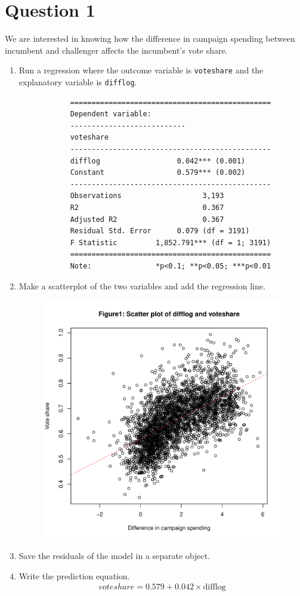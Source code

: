 \documentclass[12pt,letterpaper]{article}
\begin{document}
\section*{Question 1}
\vspace{.25cm}
\noindent We are interested in knowing how the difference in campaign spending between incumbent and challenger affects the incumbent's vote share. 
	\begin{enumerate}
		\item Run a regression where the outcome variable is \texttt{voteshare} and the explanatory variable is \texttt{difflog}.
		
		\begin{verbatim}
			===============================================
			Dependent variable:    
			---------------------------
			voteshare         
			-----------------------------------------------
			difflog                  0.042*** (0.001)      
			Constant                 0.579*** (0.002)      
			-----------------------------------------------
			Observations                   3,193           
			R2                             0.367           
			Adjusted R2                    0.367           
			Residual Std. Error      0.079 (df = 3191)     
			F Statistic         1,852.791*** (df = 1; 3191)
			===============================================
			Note:               *p<0.1; **p<0.05; ***p<0.01
		\end{verbatim} 

		\item Make a scatterplot of the two variables and add the regression line. 	
		 
		\begin{figure}[H]
			\centering
			\includegraphics[width=.5\textwidth]{Q1_2_scatterplot.pdf}
		\end{figure}

		\item Save the residuals of the model in a separate object.	
		 
		
		\item Write the prediction equation.
		\begin{align*}
			voteshare = 0.579 + 0.042 \times \text{difflog}
		\end{align*}
	\end{enumerate}
	
\end{document}
